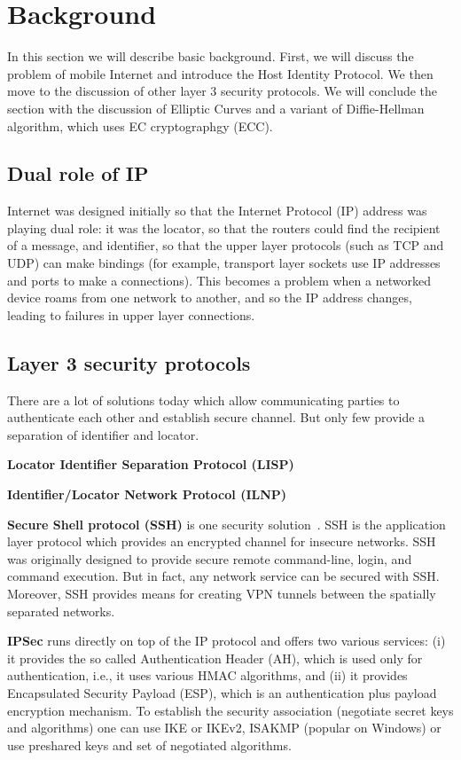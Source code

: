 \section{Background}
\label{section:background}

In this section we will describe basic background. First, we will
discuss the problem of mobile Internet and introduce the Host Identity
Protocol. We then move to the discussion of other layer 3 security protocols.
We will conclude the section with the discussion of Elliptic Curves and
a variant of Diffie-Hellman algorithm, which uses EC cryptographgy (ECC).

\subsection{Dual role of IP}

Internet was designed initially so that the Internet Protocol (IP)
address was playing dual role: it was the locator, so that the 
routers could find the recipient of a message, and identifier, so that 
the upper layer protocols (such as TCP and UDP) can make bindings 
(for example, transport layer sockets use IP addresses and ports 
to make a connections). This becomes a problem when a networked 
device roams from one network to another, and so the IP address changes, 
leading to failures in upper layer connections. 

\subsection{Layer 3 security protocols}

There are a lot of solutions today which allow communicating parties 
to authenticate each other and establish secure channel. But only few provide
a separation of identifier and locator.

{\bf Locator Identifier Separation Protocol (LISP)}

{\bf Identifier/Locator Network Protocol (ILNP)}

{\bf Secure Shell protocol (SSH)} is one security solution~\cite{ssh}. SSH is
the application layer protocol which provides an encrypted channel for insecure
networks. SSH was originally designed to provide secure  
remote command-line, login, and command execution. But in fact, 
any network service can be secured with SSH. Moreover, SSH provides
means for creating VPN tunnels between the spatially separated networks.

{\bf IPSec} runs directly on top of the IP protocol and offers two 
various services: (i) it provides the so called Authentication Header (AH),
which is used only for authentication, i.e., it uses various HMAC algorithms, and 
(ii) it provides Encapsulated Security Payload (ESP), which is an authentication 
plus payload encryption mechanism. To establish the security association (negotiate
secret keys and algorithms) one can use IKE or IKEv2, ISAKMP (popular on Windows) or
use preshared keys and set of negotiated algorithms.

